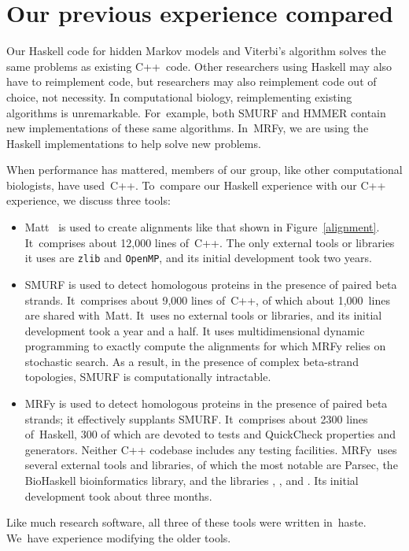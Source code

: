 \documentclass[preprint,nonatbib,blockstyle,times]{sigplanconf}
\newcommand\figref[1]{Figure~\ref{#1}}
\newcommand\seclabel[1]{\label{sec:#1}}
\let\cite\citep
\begin{document}
 
 
\section{Our previous experience compared}
\seclabel{comparo}

Our Haskell code for hidden Markov models and Viterbi's algorithm
solves the same problems as existing C++~code.
Other researchers using Haskell may also have to reimplement code,
but researchers may also reimplement code out of choice, not
necessity.
In computational biology, reimplementing existing algorithms is unremarkable.
For~example, both SMURF and HMMER contain new implementations of these
same algorithms.
In~MRFy, we are using the Haskell implementations to help solve new
problems. 

When performance has mattered, members of our group, like other
computational biologists, have used~C++.
To~compare our Haskell experience with our C++ experience,
we discuss three tools:
\begin{itemize}
\item
Matt~\cite{Menke:2008wu} is used to create alignments like that shown
in \figref{alignment}.
It~comprises about 12,000 lines of~C++.
The only external tools or libraries it uses are \texttt{zlib}
and \texttt{OpenMP}, and its initial development took two years.
\item
SMURF
\cite{Menke:2010ti} is used to detect homologous proteins in the presence
of paired beta strands.
It~comprises about 9,000 lines of~C++, of which about 1,000~lines are
shared with~Matt.
It~uses no external tools or libraries, and
its initial development took a year and a half.
It uses multidimensional dynamic programming to exactly compute the alignments
for which MRFy relies on stochastic search.
As a result, in the presence of complex beta-strand topologies, SMURF is
computationally intractable.
\item
MRFy is used to detect homologous proteins in the presence of paired
beta strands; it effectively supplants SMURF.
It~comprises about 2300 lines of~Haskell, 300 of which are devoted
to tests and QuickCheck properties and generators.
Neither C++ codebase includes any testing facilities.
MRFy~uses several external tools and libraries, of which the most
notable are Parsec, the BioHaskell bioinformatics library, and
the libraries , ,
and .
Its initial development took about three months.
\end{itemize}
Like much research software, all three of these tools were written
 in~haste.
We~have experience modifying the older tools.
\end{document}
